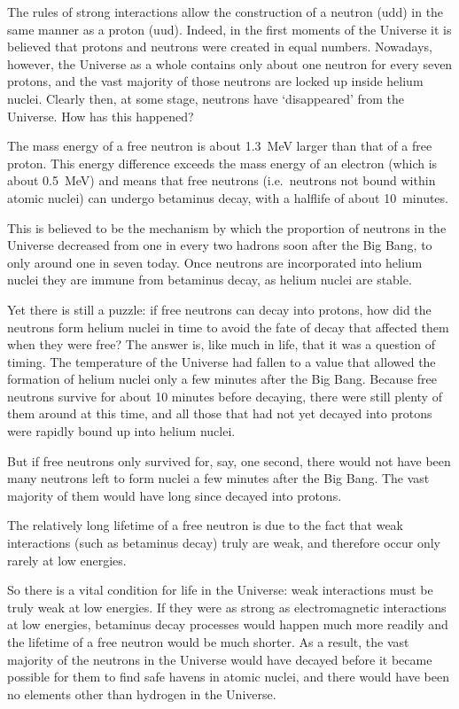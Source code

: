\documentclass[letterpaper,10pt,english]{sphinxmanual}
\begin{document}
The rules of strong interactions allow the construction of a neutron (udd) in the same manner as a proton (uud). Indeed, in the first moments of the Universe it is believed that protons and neutrons were created in equal numbers. Nowadays, however, the Universe as a whole contains only about one neutron for every seven protons, and the vast majority of those neutrons are locked up inside helium nuclei. Clearly then, at some stage, neutrons have ‘disappeared’ from the Universe. How has this
happened?

The mass energy of a free neutron is about 1.3 MeV larger than that of a free proton. This energy difference exceeds the mass energy of an electron (which is about 0.5 MeV) and means that free neutrons (i.e. neutrons not bound within atomic nuclei) can undergo beta\sphinxhyphen{}minus decay, with a half\sphinxhyphen{}life of about 10 minutes.

This is believed to be the mechanism by which the proportion of neutrons in the Universe decreased from one in every two hadrons soon after the Big Bang, to only around one in seven today. Once neutrons are incorporated into helium nuclei they are immune from beta\sphinxhyphen{}minus decay, as helium nuclei are stable.

Yet there is still a puzzle: if free neutrons can decay into protons, how did the neutrons form helium nuclei in time to avoid the fate of decay that affected them when they were free? The answer is, like much in life, that it was a question of timing. The temperature of the Universe had fallen to a value that allowed the formation of helium nuclei only a few minutes after the Big Bang. Because free neutrons survive for about 10 minutes before decaying, there were still plenty of them around at
this time, and all those that had not yet decayed into protons were rapidly bound up into helium nuclei.

But if free neutrons only survived for, say, one second, there would not have been many neutrons left to form nuclei a few minutes after the Big Bang. The vast majority of them would have long since decayed into protons.

The relatively long lifetime of a free neutron is due to the fact that weak interactions (such as beta\sphinxhyphen{}minus decay) truly are weak, and therefore occur only rarely at low energies.

So there is a vital condition for life in the Universe: weak interactions must be truly weak at low energies. If they were as strong as electromagnetic interactions at low energies, beta\sphinxhyphen{}minus decay processes would happen much more readily and the lifetime of a free neutron would be much shorter. As a result, the vast majority of the neutrons in the Universe would have decayed before it became possible for them to find safe havens in atomic nuclei, and there would have been no elements other
than hydrogen in the Universe.
\end{document}
